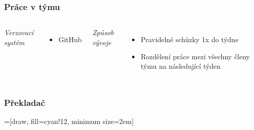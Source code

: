 
\begin{frame}
  \frametitle{Práce v týmu}
  \begin{columns}
    \emph{Verzovací systém}
    \begin{itemize}
        \item GitHub
    \end{itemize}
    \emph{Způsob vývoje}
    \begin{itemize}
        \item Pravidelné schůzky 1x do týdne
        \item Rozdělení práce mezi všechny členy týmu na následující týden
    \end{itemize}
  \end{columns}
\end{frame}




\begin{frame}
  \frametitle{Překladač}
  =[draw, fill=cyan!12, minimum size=2em]

\end{frame}



